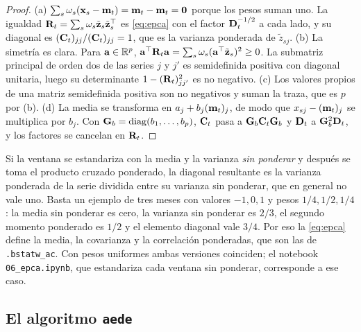 \begin{proof}
(a) $\sum_s\omega_s(\mathbf{x}_s-\mathbf{m}_t)=\mathbf{m}_t-\mathbf{m}_t=\mathbf{0}$ porque los pesos suman uno. La
igualdad $\mathbf{R}_t=\sum_s\omega_s\tilde{\mathbf{z}}_s\tilde{\mathbf{z}}_s^{\top}$ es \cref{eq:epca} con el factor
$\mathbf{D}_t^{-1/2}$ a cada lado, y su diagonal es $(\mathbf{C}_t)_{jj}/(\mathbf{C}_t)_{jj}=1$, que es la varianza
ponderada de $\tilde z_{sj}$. (b) La simetría es clara. Para $\mathbf{a}\in\mathbb{R}^p$,
$\mathbf{a}^{\top}\mathbf{R}_t\mathbf{a}=\sum_s\omega_s(\mathbf{a}^{\top}\tilde{\mathbf{z}}_s)^2\ge0$. La submatriz
principal de orden dos de las series $j$ y $j'$ es semidefinida positiva con diagonal unitaria,
luego su determinante $1-(\mathbf{R}_t)_{jj'}^2$ es no negativo. (c) Los valores propios de una matriz
semidefinida positiva son no negativos y suman la traza, que es $p$ por (b). (d) La media se
transforma en $a_j+b_j(\mathbf{m}_t)_j$, de modo que $x_{sj}-(\mathbf{m}_t)_j$ se multiplica por $b_j$. Con
$\mathbf{G}_b=\operatorname{diag}(b_1,\dots,b_p)$, $\mathbf{C}_t$ pasa a $\mathbf{G}_b\mathbf{C}_t\mathbf{G}_b$ y $\mathbf{D}_t$ a
$\mathbf{G}_b^2\mathbf{D}_t$, y los factores se cancelan en $\mathbf{R}_t$.
\end{proof}

\begin{observacion}\label{obs:m1}
Si la ventana se estandariza con la media y la varianza \emph{sin ponderar} y después se toma el
producto cruzado ponderado, la diagonal resultante es la varianza ponderada de la serie dividida
entre su varianza sin ponderar, que en general no vale uno. Basta un ejemplo de tres meses con
valores $-1,0,1$ y pesos $1/4,1/2,1/4$: la media sin ponderar es cero, la varianza sin ponderar es
$2/3$, el segundo momento ponderado es $1/2$ y el elemento diagonal vale $3/4$. Por eso la
\cref{eq:epca} define la media, la covarianza y la correlación ponderadas, que son las de
\texttt{.bstatw\_ac}. Con pesos uniformes ambas versiones coinciden; el notebook
\texttt{06\_epca.ipynb}, que estandariza cada ventana sin ponderar, corresponde a ese caso.
\end{observacion}

\subsection{El algoritmo \texttt{aede}}

